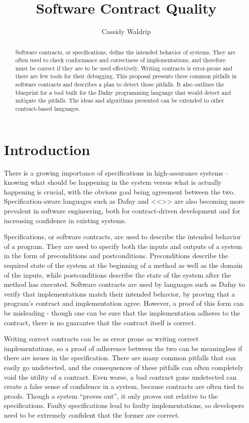 \documentclass{article}
\title{Software Contract Quality}
\author{Cassidy Waldrip}
\begin{document}
\maketitle

\begin{abstract}

Software contracts, or specifications, define the intended behavior of systems. They are often used to check
conformance and correctness of implementations, and therefore must be correct if they are to be used effectively.
Writing contracts is error-prone and there are few tools for their debugging. This proposal presents three common
pitfalls in software contracts and describes a plan to detect those pitfalls. It also outlines the
blueprint for a tool built for the Dafny programming language that would detect and mitigate the pitfalls. The ideas
and algorithms presented can be extended to other contract-based languages.

\end{abstract}

\section{Introduction}

There is a growing importance of specifications in high-assurance systems – knowing what should be happening
in the system versus what is actually happening is crucial, with the obvious goal being agreement
between the two. Specification-aware languages such as Dafny \cite{dafny} and <<>> are also becoming more prevalent in
software engineering, both for contract-driven development and for increasing confidence in existing systems.

Specifications, or software contracts, are used to describe the intended behavior of a program. They are used
to specify both the inputs and outputs of a system in the form of preconditions and postconditions. Preconditions
describe the required state of the system at the beginning of a method as well as the domain of the inputs,
while postconditions describe the state of the system after the method has executed. Software contracts
are used by languages such as Dafny to verify that implementations match their intended behavior, by proving
that a program’s contract and implementation agree. However, a proof of this form can be misleading - though
one can be sure that the implementation adheres to the contract, there is no guarantee that the contract itself
is correct.

Writing correct contracts can be as error prone as writing correct implementations, so a proof of adherence
between the two can be meaningless if there are issues in the specification. There are many common pitfalls
that can easily go undetected, and the consequences of these pitfalls can often completely void the utility of
a contract. Even worse, a bad contract gone undetected can create a false sense of confidence in a system,
because contracts are often tied to proofs. Though a system “proves out”, it only proves out relative to the
specifications. Faulty specifications lead to faulty implementations, so developers need to be extremely confident
that the former are correct.
\end{document}
